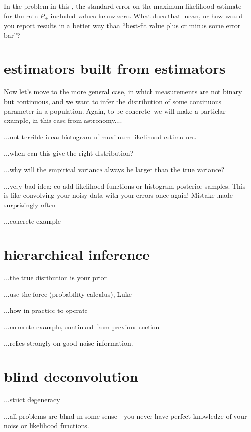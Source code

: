 \documentclass[12pt,twoside]{article}
\begin{document}
\begin{problem}
In the problem in this \sectionname, the standard error on the
maximum-likelihood estimate for the rate $P_+$ included
values below zero.  What does that mean, or how would you report
results in a better way than ``best-fit value plus or minus some error
bar''?
\end{problem}

\section{estimators built from estimators}

Now let's move to the more general case, in which measurements are not
binary but continuous, and we want to infer the distribution of some
continuous parameter in a population.  Again, to be concrete, we will
make a particlar example, in this case from astronomy....

...not terrible idea: histogram of maximum-likelihood estimators.

...when can this give the right distribution?

...why will the empirical variance always be larger than the true variance?

...very bad idea: co-add likelihood functions or histogram posterior
samples.  This is like convolving your noisy data with your errors
once again!  Mistake made surprisingly often.

...concrete example

\section{hierarchical inference}

...the true disribution is your prior

...use the force (probability calculus), Luke

...how in practice to operate

...concrete example, continued from previous section

...relies strongly on good noise information.

\section{blind deconvolution}

...strict degeneracy

...all problems are blind in some sense---you never have perfect
knowledge of your noise or likelihood functions.
\end{document}

